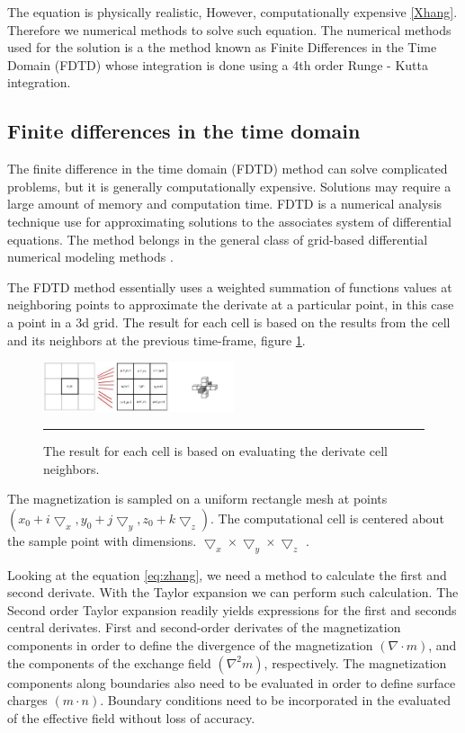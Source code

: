 The equation is physically realistic, However, computationally expensive \ref{Xhang}. Therefore we numerical methods to solve such equation. The numerical methods used for the solution is a the method known as Finite Differences in the Time Domain (FDTD) whose integration is done using a 4th order Runge - Kutta integration.

\subsection{Finite differences in the time domain}

The finite difference in the time domain (FDTD) method can solve complicated problems, but it is generally computationally expensive. Solutions may require a large amount of memory and computation time.  FDTD is a numerical analysis technique use for approximating solutions to the associates system of differential equations. The method belongs in the general class of grid-based differential numerical modeling methods \cite{methods}.

The FDTD method essentially uses a weighted summation of functions values at neighboring points to approximate the derivate at a particular point, in this case a point in a 3d grid. The result for each cell is based on the results from the cell and its neighbors at the previous time-frame, figure \ref{fig:fdtd}.  

\begin{figure}[htbp]
	\centering
		\includegraphics[width=0.5\textwidth]{Figures/fdtd.png}
		\rule{35em}{0.2pt}
	\caption[FDTD grid]{The result for each cell is based on evaluating the derivate cell neighbors.}
	\label{fig:fdtd}
\end{figure}

The magnetization is sampled on a uniform rectangle mesh at points $(x_0 + i\bigtriangledown_x, y_0 + j\bigtriangledown_y, z_0 + k\bigtriangledown_z)$. The computational cell is centered about the sample point with dimensions. $\bigtriangledown_x \times \bigtriangledown_y \times \bigtriangledown_z$ \cite{methods}.

Looking at the equation \ref{eq:zhang}, we need a method to calculate the first and second derivate. With the Taylor expansion we can perform such calculation. The Second order Taylor expansion readily yields expressions for the first and seconds central derivates. First and second-order derivates of the magnetization components in order to define the divergence  of the magnetization $(\nabla \cdot m)$, and the components of the exchange field $(\nabla^2m)$, respectively. The magnetization components along boundaries also need to be evaluated in order to define surface charges $(m \cdot n)$. Boundary conditions need to be incorporated in the evaluated of the effective field without loss of accuracy. 

